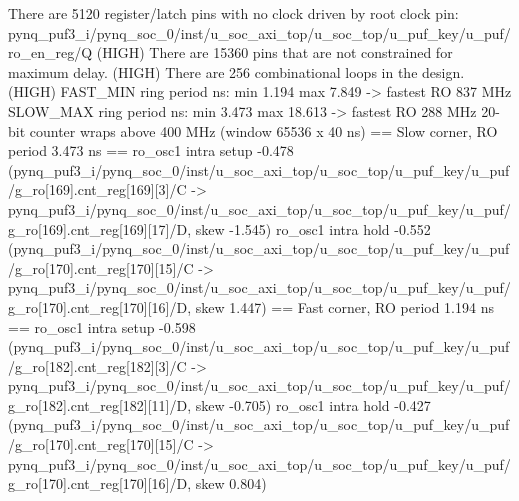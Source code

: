 \begin{codeblock}
There are 5120 register/latch pins with no clock driven by root clock pin: pynq_puf3_i/pynq_soc_0/inst/u_soc_axi_top/u_soc_top/u_puf_key/u_puf/ro_en_reg/Q (HIGH)
 There are 15360 pins that are not constrained for maximum delay. (HIGH)
 There are 256 combinational loops in the design. (HIGH)
FAST_MIN ring period ns: min 1.194 max 7.849 -> fastest RO 837 MHz
SLOW_MAX ring period ns: min 3.473 max 18.613 -> fastest RO 288 MHz
20-bit counter wraps above 400 MHz (window 65536 x 40 ns)
== Slow corner, RO period 3.473 ns ==
  ro_osc1 intra setup -0.478 (pynq_puf3_i/pynq_soc_0/inst/u_soc_axi_top/u_soc_top/u_puf_key/u_puf/g_ro[169].cnt_reg[169][3]/C -> pynq_puf3_i/pynq_soc_0/inst/u_soc_axi_top/u_soc_top/u_puf_key/u_puf/g_ro[169].cnt_reg[169][17]/D, skew -1.545)
  ro_osc1 intra hold  -0.552 (pynq_puf3_i/pynq_soc_0/inst/u_soc_axi_top/u_soc_top/u_puf_key/u_puf/g_ro[170].cnt_reg[170][15]/C -> pynq_puf3_i/pynq_soc_0/inst/u_soc_axi_top/u_soc_top/u_puf_key/u_puf/g_ro[170].cnt_reg[170][16]/D, skew 1.447)
== Fast corner, RO period 1.194 ns ==
  ro_osc1 intra setup -0.598 (pynq_puf3_i/pynq_soc_0/inst/u_soc_axi_top/u_soc_top/u_puf_key/u_puf/g_ro[182].cnt_reg[182][3]/C -> pynq_puf3_i/pynq_soc_0/inst/u_soc_axi_top/u_soc_top/u_puf_key/u_puf/g_ro[182].cnt_reg[182][11]/D, skew -0.705)
  ro_osc1 intra hold  -0.427 (pynq_puf3_i/pynq_soc_0/inst/u_soc_axi_top/u_soc_top/u_puf_key/u_puf/g_ro[170].cnt_reg[170][15]/C -> pynq_puf3_i/pynq_soc_0/inst/u_soc_axi_top/u_soc_top/u_puf_key/u_puf/g_ro[170].cnt_reg[170][16]/D, skew 0.804)
\end{codeblock}
